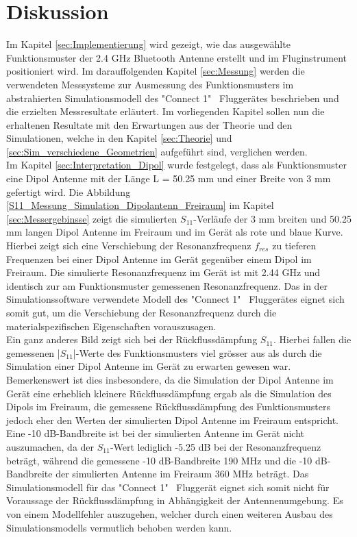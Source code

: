\chapter{Diskussion}
Im Kapitel \ref{sec:Implementierung} wird gezeigt, wie das ausgewählte Funktionsmuster der 2.4 GHz Bluetooth Antenne erstellt und im Fluginstrument positioniert wird. Im darauffolgenden Kapitel \ref{sec:Messung} werden die verwendeten Messsysteme zur Ausmessung des Funktionsmusters im abstrahierten Simulationsmodell des "Connect 1" \ Fluggerätes beschrieben und die erzielten Messresultate erläutert. Im vorliegenden Kapitel sollen nun die erhaltenen Resultate mit den Erwartungen aus der Theorie und den Simulationen, welche in den Kapitel \ref{sec:Theorie}
 und \ref{sec:Sim_verschiedene_Geometrien}
 aufgeführt sind, verglichen werden.\\
Im Kapitel \ref{sec:Interpretation_Dipol} wurde festgelegt, dass als Funktionsmuster eine Dipol Antenne mit der Länge L = 50.25 mm und einer Breite von 3 mm gefertigt wird. Die Abbildung \ref{S11_Messung_Simulation_Dipolantenn_Freiraum} im Kapitel \ref{sec:Messergebinsse} zeigt die simulierten $S_{11}$-Verläufe der 3 mm breiten und 50.25 mm langen Dipol Antenne im Freiraum und im Gerät als rote und blaue Kurve. Hierbei zeigt sich eine Verschiebung der Resonanzfrequenz $f_{res}$ zu tieferen Frequenzen bei einer Dipol Antenne im Gerät gegenüber einem Dipol im Freiraum. Die simulierte Resonanzfrequenz im Gerät ist mit 2.44 GHz und identisch zur am Funktionsmuster gemessenen Resonanzfrequenz. Das in der Simulationssoftware verwendete Modell des "Connect 1" \ Fluggerätes eignet sich somit gut, um die Verschiebung der Resonanzfrequenz durch die materialspezifischen Eigenschaften vorauszusagen.\\
Ein ganz anderes Bild zeigt sich bei der Rückflussdämpfung $S_{11}$. Hierbei fallen die gemessenen |$S_{11}$|-Werte des Funktionsmusters viel grösser aus als durch die Simulation einer Dipol Antenne im Gerät zu erwarten gewesen war. Bemerkenswert ist dies insbesondere, da die Simulation der Dipol Antenne im Gerät eine erheblich kleinere Rückflussdämpfung ergab als die Simulation des Dipols im Freiraum, die gemessene Rückflussdämpfung des Funktionsmusters jedoch eher den Werten der simulierten Dipol Antenne im Freiraum entspricht. Eine -10 dB-Bandbreite ist bei der simulierten Antenne im Gerät nicht auszumachen, da der $S_{11}$-Wert lediglich -5.25 dB bei der Resonanzfrequenz beträgt, während die gemessene -10 dB-Bandbreite 190 MHz und die -10 dB-Bandbreite der simulierten Antenne im Freiraum 360 MHz beträgt. Das Simulationsmodell für das "Connect 1" \  Fluggerät eignet sich somit nicht für Voraussage der Rückflussdämpfung in Abhängigkeit der Antennenumgebung. Es von einem Modellfehler auszugehen, welcher durch einen weiteren Ausbau des Simulationsmodells vermutlich behoben werden kann.\\
